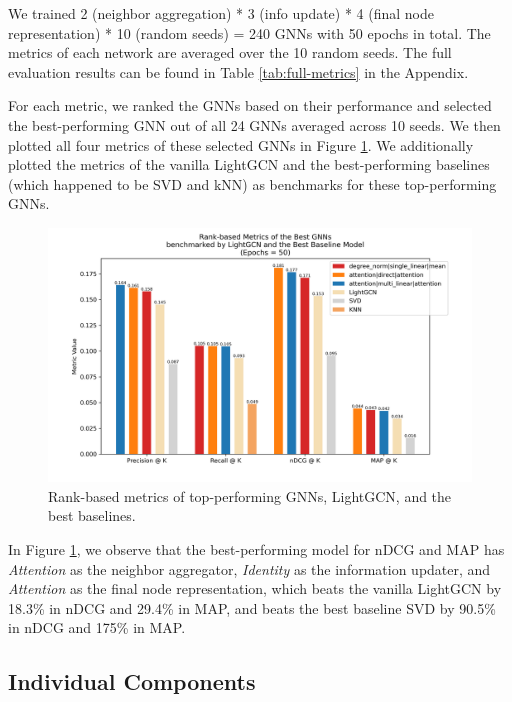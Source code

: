 \documentclass{article}
\begin{document}
We trained 2 (neighbor aggregation) * 3 (info update) * 4 (final node representation) * 10 (random seeds) = 240 GNNs with 50 epochs in total. The metrics of each network are averaged over the 10 random seeds. The full evaluation results can be found in Table \ref{tab:full-metrics} in the Appendix. 

For each metric, we ranked the GNNs based on their performance and selected the best-performing GNN out of all 24 GNNs averaged across 10 seeds. We then plotted all four metrics of these selected GNNs in Figure \ref{fig:metrics-overall}. We additionally plotted the metrics of the vanilla LightGCN and the best-performing baselines (which happened to be SVD and kNN) as benchmarks for these top-performing GNNs.

\begin{figure}[h]
    \centering
    \includegraphics[width=.75\textwidth]{figs/best_models_and_baselines.png}
    \caption{Rank-based metrics of top-performing GNNs, LightGCN, and the best baselines.}
    \label{fig:metrics-overall}
\end{figure}

In Figure \ref{fig:metrics-overall}, we observe that the best-performing model for nDCG and MAP has \textit{Attention} as the neighbor aggregator, \textit{Identity} as the information updater, and \textit{Attention} as the final node representation, which beats the vanilla LightGCN by 18.3\% in nDCG and 29.4\% in MAP, and beats the best baseline SVD by 90.5\% in nDCG and 175\% in MAP.

\subsection{Individual Components} \label{eval-individual-components}
\end{document}
